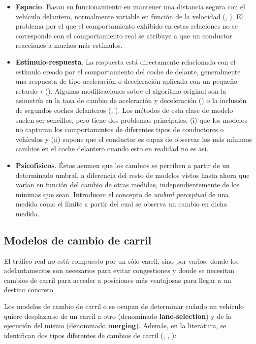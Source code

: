 \begin{itemize}
	\item \textbf{Espacio}. Basan su funcionamiento en mantener una distancia segura con el vehículo delantero, normalmente variable en función de la velocidad (\cite{Pipes1953}, ). El problema por el que el comportamiento exhibido en estas relaciones no se corresponde con el comportamiento real se atribuye a que un conductor reacciones a muchos más estímulos.
	\item \textbf{Estímulo-respuesta}. La respuesta está directamente relacionada con el estímulo creado por el comportamiento del coche de delante, generalmente una respuesta de tipo aceleración o deceleración aplicada con un pequeño retardo $\tau$ (\cite{Chandler1958}). Algunas modificaciones sobre el algoritmo original son la asimetría en la tasa de cambio de aceleración y deceleración () o la inclusión de segundos coches delanteros (, ). Los métodos de esta clase de modelo suelen ser sencillos, pero tiene dos problemas principales, (i) que los modelos no capturan los comportamintos de diferentes tipos de conductores o vehículos y (ii) supone que el conductor es capaz de observar los más mínimos cambios en el coche delantero cuando esto en realidad no es así.
	\item \textbf{Psicofísicos}. Éstos asumen que los cambios se perciben a partir de un determinado umbral, a diferencia del resto de modelos vistos hasta ahora que varían en función del cambio de otras medidas, independientemente de los mínimas que sean. Introducen el concepto de \textit{umbral perceptual} de una medida como el límite a partir del cual se observa un cambio en dicha medida.
\end{itemize}

\subsection{Modelos de cambio de carril}

El tráfico real no está compuesto por un sólo carril, sino por varios, donde los adelantamentos son necesarios para evitar congestiones y donde se necesitan cambios de carril para acceder a posiciones más ventajosas para llegar a un destino concreto.

Los modelos de cambio de carril o \textit{} se ocupan de determinar cuándo un vehículo quiere desplazarse de un carril a otro (denominado \textbf{lane-selection}) y de la ejecución del mismo (denominado \textbf{merging}). Además, en la literatura, se identifican dos tipos diferentes de cambios de carril (\cite{Gipps1986}, \cite{Yang1996}, \cite{Toledo2003}):

